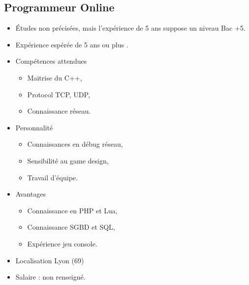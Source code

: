 \documentclass[12pt, a4paper]{report} %
\begin{document}
\subsection{Programmeur Online}
\begin{itemize}
\item Études non précisées, mais l'expérience de 5 ans suppose un niveau Bac +5.
\item Expérience espérée de 5 ans ou plus .
\item Compétences attendues  
  \begin{itemize}
    \item  Maitrise du C++,
    \item  Protocol TCP, UDP,
    \item  Connaissance réseau.
  \end{itemize}
\item Personnalité 
  \begin{itemize}
    \item Connaissances en débug réseau,
    \item Sensibilité au game design,
    \item Travail d'équipe.
  \end{itemize}
\item Avantages 
  \begin{itemize}
    \item Connaissance en PHP et Lua,
    \item Connaissance SGBD et SQL,
    \item Expérience jeu console.
  \end{itemize}
\item Localisation  Lyon (69)
\item Salaire : non renseigné.
\end{itemize}
\end{document}
